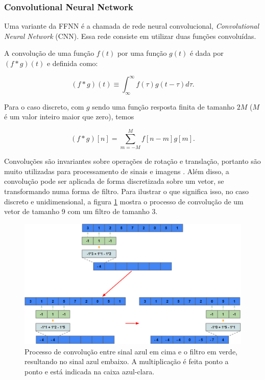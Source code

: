 \documentclass[a4paper,12pt,oneside]{book}
\begin{document}
\subsubsection*{Convolutional Neural Network}

\par Uma variante da FFNN é a chamada de rede neural convolucional, \textit{Convolutional Neural Network} (CNN). Essa rede consiste em utilizar duas funções convoluídas.
\par A convolução de uma função $f(t)$ por uma função $g(t)$ é dada por $(f*g)(t)$ e definida como: 


\begin{equation}\label{eq:conv_cont}
    (f*g)(t) \equiv \int^{\infty}_{\infty} f(\tau)g(t - \tau)d\tau.
\end{equation}

Para o caso discreto, com $g$ sendo uma função resposta finita de tamanho $2M$ ($M$ é um valor inteiro maior que zero), temos

\begin{equation}\label{eq:conv_disc}
    (f*g)[n] = \sum^{M}_{m = -M} f[n - m]g[m]. 
\end{equation}

\par Convoluções são invariantes sobre operações de rotação e translação, portanto são muito utilizadas para processamento de sinais e imagens \cite{signal_book}. Além disso, a convolução pode ser aplicada de forma discretizada sobre um vetor, se transformando numa forma de filtro. Para ilustrar o que significa isso, no caso discreto e unidimensional, a figura \ref{fig:conv_valid} mostra o processo de convolução de um vetor de tamanho 9 com um filtro de tamanho 3.

\begin{figure}[H]
    \centering
    \includegraphics[scale = 0.38]{figs/conv_valid.png}
    \caption{Processo de convolução entre sinal azul em cima e o filtro em verde, resultando no sinal azul embaixo. A multiplicação é feita ponto a ponto e está indicada na caixa azul-clara.}
    \label{fig:conv_valid}
\end{figure}
\end{document}
